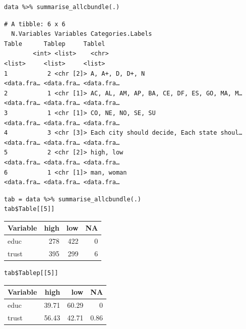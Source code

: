 \documentclass[a4paper]{article}
\begin{document}
\lstset{numbers=left,language=r,label=orgd91cad4,caption= ,captionpos=b}
\begin{lstlisting}
data %>% summarise_allcbundle(.) 
\end{lstlisting}

\begin{verbatim}
# A tibble: 6 x 6
  N.Variables Variables Categories.Labels                          Table      Tablep     Tablel    
        <int> <list>    <chr>                                      <list>     <list>     <list>    
1           2 <chr [2]> A, A+, D, D+, N                            <data.fra… <data.fra… <data.fra…
2           1 <chr [1]> AC, AL, AM, AP, BA, CE, DF, ES, GO, MA, M… <data.fra… <data.fra… <data.fra…
3           1 <chr [1]> CO, NE, NO, SE, SU                         <data.fra… <data.fra… <data.fra…
4           3 <chr [3]> Each city should decide, Each state shoul… <data.fra… <data.fra… <data.fra…
5           2 <chr [2]> high, low                                  <data.fra… <data.fra… <data.fra…
6           1 <chr [1]> man, woman                                 <data.fra… <data.fra… <data.fra…
\end{verbatim}







\lstset{numbers=left,language=r,label=org915ec78,caption= ,captionpos=b}
\begin{lstlisting}
tab = data %>% summarise_allcbundle(.)
tab$Table[[5]]
\end{lstlisting}

\begin{center}
\begin{tabular}{lrrr}
Variable & high & low & NA\\
\hline
educ & 278 & 422 & 0\\
trust & 395 & 299 & 6\\
\end{tabular}
\end{center}



\lstset{numbers=left,language=r,label=org69952a9,caption= ,captionpos=b}
\begin{lstlisting}
tab$Tablep[[5]]
\end{lstlisting}

\begin{center}
\begin{tabular}{lrrr}
Variable & high & low & NA\\
\hline
educ & 39.71 & 60.29 & 0\\
trust & 56.43 & 42.71 & 0.86\\
\end{tabular}
\end{center}
\end{document}
